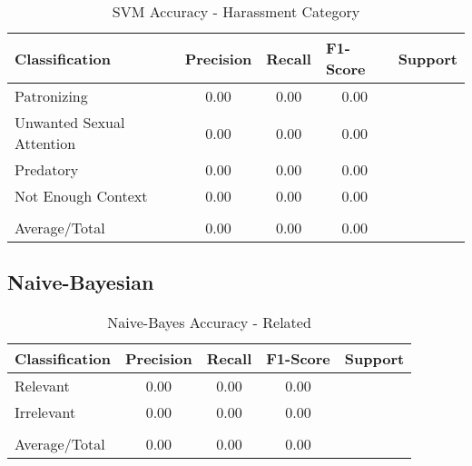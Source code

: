 \begin{table}[H]
    \centering
    \caption{SVM Accuracy - Harassment Category}
    \begin{tabular}{m{4.5cm} m{1.5cm} m{1.1cm} m{1.6cm} m{1.5cm}}
        \toprule
        \rowcolor{White}\textbf{Classification} & {\textbf{Precision}} & {\textbf{Recall}} & {\textbf{F1-Score}} & {\textbf{Support}} \\
                \midrule
        Patronizing & \multicolumn{1}{c}{0.00} & \multicolumn{1}{c}{0.00} & \multicolumn{1}{c}{0.00} & \multicolumn{1}{c}{ }\\
        Unwanted Sexual Attention & \multicolumn{1}{c}{0.00} & \multicolumn{1}{c}{0.00} & \multicolumn{1}{c}{0.00} & \multicolumn{1}{c}{ }\\
        Predatory & \multicolumn{1}{c}{0.00} & \multicolumn{1}{c}{0.00} & \multicolumn{1}{c}{0.00} & \multicolumn{1}{c}{ }\\
        Not Enough Context & \multicolumn{1}{c}{0.00} & \multicolumn{1}{c}{0.00} & \multicolumn{1}{c}{0.00} & \multicolumn{1}{c}{ }\\
         & \multicolumn{1}{c}{} & \multicolumn{1}{c}{} & \multicolumn{1}{c}{} & \multicolumn{1}{c}{}\\
        \rowcolor{White}Average/Total & \multicolumn{1}{c}{0.00} & \multicolumn{1}{c}{0.00} & \multicolumn{1}{c}{0.00} & \multicolumn{1}{c}{ }\\

        \bottomrule
    \end{tabular}
\end{table}

\subsection{Naive-Bayesian}

\begin{table}[H]
    \centering
    \caption{Naive-Bayes Accuracy - Related}
    \begin{tabular}{m{4.5cm} m{1.5cm} m{1.1cm} m{1.6cm} m{1.5cm}}
        \toprule
        \rowcolor{White}\textbf{Classification} & {\textbf{Precision}} & {\textbf{Recall}} & {\textbf{F1-Score}} & {\textbf{Support}} \\
                \midrule
        Relevant & \multicolumn{1}{c}{0.00} & \multicolumn{1}{c}{0.00} & \multicolumn{1}{c}{0.00} & \multicolumn{1}{c}{ }\\
        Irrelevant & \multicolumn{1}{c}{0.00} & \multicolumn{1}{c}{0.00} & \multicolumn{1}{c}{0.00} & \multicolumn{1}{c}{ }\\
         & \multicolumn{1}{c}{} & \multicolumn{1}{c}{} & \multicolumn{1}{c}{} & \multicolumn{1}{c}{}\\
        \rowcolor{White}Average/Total & \multicolumn{1}{c}{0.00} & \multicolumn{1}{c}{0.00} & \multicolumn{1}{c}{0.00} & \multicolumn{1}{c}{ }\\

        \bottomrule
    \end{tabular}
\end{table}

